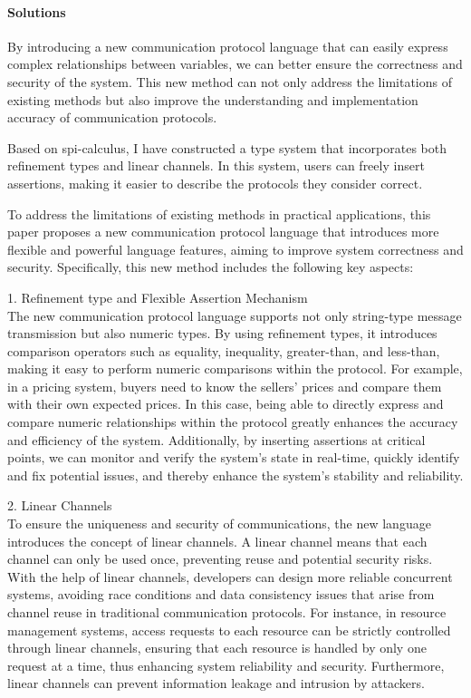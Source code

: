 \documentclass[master,english]{kuisthesis}
\begin{document}
\paragraph{Solutions}

By introducing a new communication protocol language that can easily express complex relationships between variables, we can better ensure the correctness and security of the system. This new method can not only address the limitations of existing methods but also improve the understanding and implementation accuracy of communication protocols.

Based on spi-calculus, I have constructed a type system that incorporates both refinement types and linear channels. In this system, users can freely insert assertions, making it easier to describe the protocols they consider correct.






To address the limitations of existing methods in practical applications, this paper proposes a new communication protocol language that introduces more flexible and powerful language features, aiming to improve system correctness and security. Specifically, this new method includes the following key aspects:

1. Refinement type and Flexible Assertion Mechanism\\
The new communication protocol language supports not only string-type message transmission but also numeric types. By using refinement types, it introduces comparison operators such as equality, inequality, greater-than, and less-than, making it easy to perform numeric comparisons within the protocol. For example, in a pricing system, buyers need to know the sellers' prices and compare them with their own expected prices. In this case, being able to directly express and compare numeric relationships within the protocol greatly enhances the accuracy and efficiency of the system. Additionally, by inserting assertions at critical points, we can monitor and verify the system's state in real-time, quickly identify and fix potential issues, and thereby enhance the system's stability and reliability.

2. Linear Channels\\
To ensure the uniqueness and security of communications, the new language introduces the concept of linear channels. A linear channel means that each channel can only be used once, preventing reuse and potential security risks. With the help of linear channels, developers can design more reliable concurrent systems, avoiding race conditions and data consistency issues that arise from channel reuse in traditional communication protocols. For instance, in resource management systems, access requests to each resource can be strictly controlled through linear channels, ensuring that each resource is handled by only one request at a time, thus enhancing system reliability and security. Furthermore, linear channels can prevent information leakage and intrusion by attackers.
\end{document}
